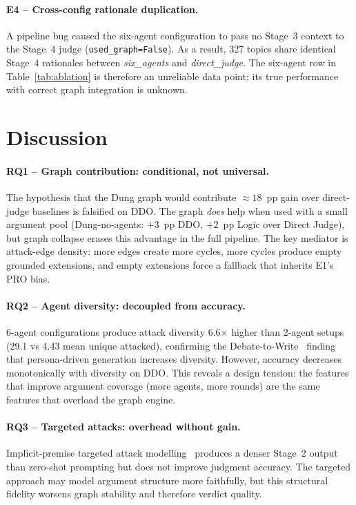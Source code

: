 \documentclass[11pt,twocolumn,letterpaper]{article}
\begin{document}
\paragraph{E4 -- Cross-config rationale duplication.}
A pipeline bug caused the six-agent configuration to pass no Stage~3
context to the Stage~4 judge (\texttt{used\_graph=False}).
As a result, 327 topics share identical Stage~4 rationales between
\textit{six\_agents} and \textit{direct\_judge}.
The six-agent row in Table~\ref{tab:ablation} is therefore an unreliable
data point; its true performance with correct graph integration is unknown.

\section{Discussion}

\paragraph{RQ1 -- Graph contribution: conditional, not universal.}
The hypothesis that the Dung graph would contribute ${\approx}18$~pp gain
over direct-judge baselines is falsified on DDO.
The graph \emph{does} help when used with a small argument pool
(Dung-no-agents: $+3$~pp DDO, $+2$~pp Logic over Direct Judge), but graph
collapse erases this advantage in the full pipeline.
The key mediator is attack-edge density: more edges create more cycles,
more cycles produce empty grounded extensions, and empty extensions force a
fallback that inherits E1's PRO bias.

\paragraph{RQ2 -- Agent diversity: decoupled from accuracy.}
6-agent configurations produce attack diversity 6.6× higher than 2-agent
setups (29.1 vs 4.43 mean unique attacked), confirming the
Debate-to-Write~\citep{hu2025debate2write} finding that persona-driven
generation increases diversity.
However, accuracy decreases monotonically with diversity on DDO.
This reveals a design tension: the features that improve argument coverage
(more agents, more rounds) are the same features that overload the graph
engine.

\paragraph{RQ3 -- Targeted attacks: overhead without gain.}
Implicit-premise targeted attack modelling~\citep{ozaki2025llmdebate}
produces a denser Stage~2 output than zero-shot prompting but does not
improve judgment accuracy.
The targeted approach may model argument structure more faithfully, but
this structural fidelity worsens graph stability and therefore verdict
quality.
\end{document}
